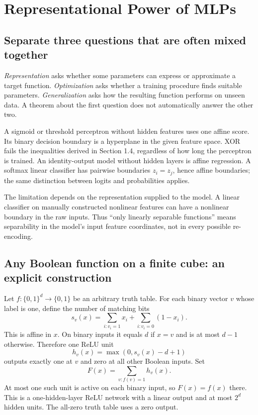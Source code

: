 \section{Representational Power of MLPs}
\label{sec:logreg_to_mlp:representational_power_of_mlps}

\subsection{Separate three questions that are often mixed together}
\emph{Representation} asks whether some parameters can express or approximate a target function. \emph{Optimization} asks whether a training procedure finds suitable parameters. \emph{Generalization} asks how the resulting function performs on unseen data. A theorem about the first question does not automatically answer the other two.

A sigmoid or threshold perceptron without hidden features uses one affine score. Its binary decision boundary is a hyperplane in the given feature space. XOR fails the inequalities derived in Section 1.4, regardless of how long the perceptron is trained. An identity-output model without hidden layers is affine regression. A softmax linear classifier has pairwise boundaries $z_i=z_j$, hence affine boundaries; the same distinction between logits and probabilities applies.

The limitation depends on the representation supplied to the model. A linear classifier on manually constructed nonlinear features can have a nonlinear boundary in the raw inputs. Thus ``only linearly separable functions'' means separability in the model's input feature coordinates, not in every possible re-encoding.

\subsection{Any Boolean function on a finite cube: an explicit construction}
Let $f:\{0,1\}^d\to\{0,1\}$ be an arbitrary truth table. For each binary vector $v$ whose label is one, define the number of matching bits
\[
 s_v(x)=\sum_{i:v_i=1}x_i+\sum_{i:v_i=0}(1-x_i).
\]
This is affine in $x$. On binary inputs it equals $d$ if $x=v$ and is at most $d-1$ otherwise. Therefore one ReLU unit
\[
 h_v(x)=\max(0,s_v(x)-d+1)
\]
outputs exactly one at $v$ and zero at all other Boolean inputs. Set
\[
 F(x)=\sum_{v:f(v)=1}h_v(x).
\]
At most one such unit is active on each binary input, so $F(x)=f(x)$ there. This is a one-hidden-layer ReLU network with a linear output and at most $2^d$ hidden units. The all-zero truth table uses a zero output.

